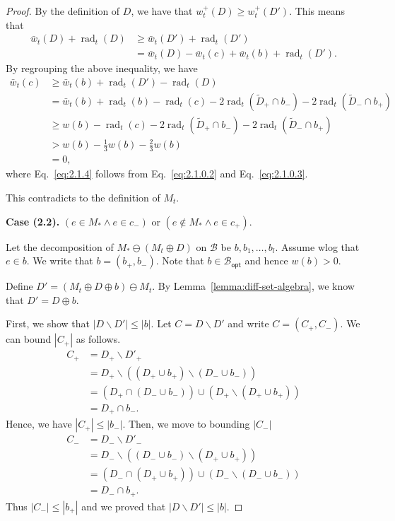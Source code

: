 \documentclass{article}
\newcommand{\B}{\mathcal B}
\newcommand{\del}{\backslash}
\newcommand{\Bopt}{\mathcal B_{\mathsf{opt}}}
\DeclareMathOperator{\rad}{rad}
\begin{document}
\begin{spacing}{1.1}
\begin{proof}
By the definition of $D$, we have that $w^+_t(D) \ge w^+_t(D')$. 
This means that 
\begin{align}
	\bar w_t(D)+\rad_t(D) &\ge \bar w_t(D')+\rad_t(D')\\
						  &= \bar w_t(D)-\bar w_t(c)+\bar w_t(b)+\rad_t(D').
\end{align}
By regrouping the above inequality, we have
\begin{align}
   \bar w_t(c) &\ge \bar w_t(b) + \rad_t(D')-\rad_t(D) \\
   			   &= \bar w_t(b)+\rad_t(b)-\rad_t(c)-2\rad_t(\tilde D_+\cap b_-)-2\rad_t(\tilde D_-\cap b_+)\\
   			   &\ge w(b)-\rad_t(c)-2\rad_t(\tilde D_+\cap b_-)-2\rad_t(\tilde D_-\cap b_+) \\
   			   &> w(b)-\frac13 w(b)-\frac23 w(b) \label{eq:2.1.4}\\
   			   &= 0,
\end{align}
where Eq.~\eqref{eq:2.1.4} follows from Eq.~\eqref{eq:2.1.0.2} and Eq.~\eqref{eq:2.1.0.3}.

This contradicts to the definition of $M_t$.

\textbf{Case (2.2).}
$(e \in M_* \wedge e\in c_-)$ or $(e \not \in M_* \wedge e\in c_+)$.

Let the decomposition of $M_* \ominus (M_t\oplus D)$ on $\B$ be $b,b_1,\ldots, b_l$.
Assume wlog that $e\in b$.
We write that $b=(b_+,b_-)$.
Note that $b\in \Bopt$ and hence $w(b)>0$.

Define $D'=(M_t\oplus D\oplus b)\ominus M_t$. By Lemma~\ref{lemma:diff-set-algebra}, we know that $D' = D\oplus b$.

First, we show that $|D\del D'| \le |b|$.
Let $C=D\del D'$ and write $C=(C_+,C_-)$.
We can bound $|C_+|$ as follows.
\begin{align*}
	C_+ &= D_+\del D'_+\\
		&= D_+\del \left((D_+\cup b_+) \del (D_-\cup b_-)\right)\\
		&= (D_+ \cap (D_-\cup b_-)) \cup (D_+ \del (D_+\cup b_+))\\
		&= D_+\cap b_-.
\end{align*}
Hence, we have $|C_+| \le |b_-|$.
Then, we move to bounding $|C_-|$
\begin{align*}
	C_- &= D_-\del D'_-\\
		&= D_-\del \left((D_-\cup b_-) \del (D_+\cup b_+)\right)\\
		&= (D_- \cap (D_+\cup b_+)) \cup (D_- \del (D_-\cup b_-))\\
		&= D_-\cap b_+.
\end{align*}
Thus $|C_-|\le |b_+|$ and we proved that $|D\del D'|\le |b|$.



\end{proof}
\end{spacing}
\end{document}
